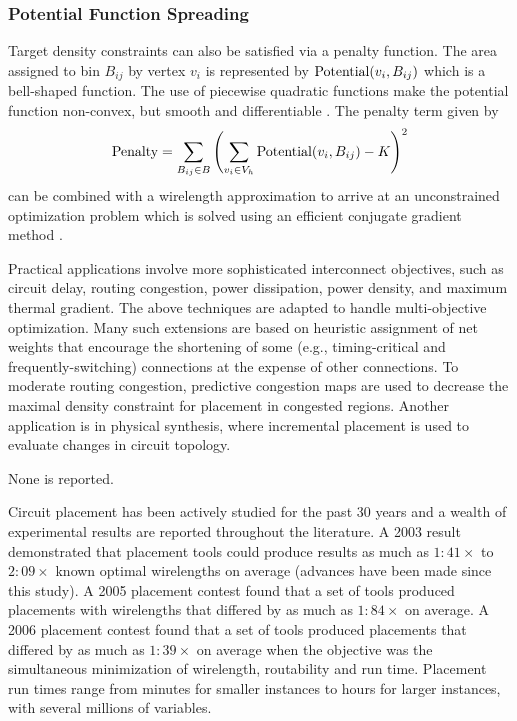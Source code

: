 \documentclass[natbib]{svcyclop}
\begin{document}
\subsubsection{Potential Function Spreading} Target density constraints
can also be satisfied via a penalty function. The
area assigned to bin $B_{ij}$ by vertex $v_i$ is represented by
$\hbox{Potential}(v_i,B_{ij})$ which is a bell-shaped function. The use
of piecewise quadratic functions make the potential function
non-convex, but smooth and differentiable \cite{KhaWan05}. The
penalty term given by
\begin{equation}\label{eq:fifth}
\text{Penalty} = \sum_{B_{ij}\in B}\left(\sum_{v_i\in V_h}\hbox{Potential}(v_i,B_{ij})-K\right)^2
\end{equation}
can be combined with a wirelength approximation to arrive
at an unconstrained optimization problem which is
solved using an efficient conjugate gradient method \cite{KhaWan05}.

\Applic

Practical applications involve more sophisticated interconnect
objectives, such as circuit delay, routing congestion,
power dissipation, power density, and maximum thermal gradient.
The above techniques are adapted to
handle multi-objective optimization. Many such extensions
are based on heuristic assignment of net weights that
encourage the shortening of some (e.g., timing-critical
and frequently-switching) connections at the expense of
other connections. To moderate routing congestion, predictive
congestion maps are used to decrease the maximal
density constraint for placement in congested regions. Another
application is in physical synthesis, where incremental
placement is used to evaluate changes in circuit topology.

\OpenProb

None is reported.

\ExpRes

Circuit placement has been actively studied for the past
30 years and a wealth of experimental results are reported
throughout the literature. A 2003 result demonstrated that
placement tools could produce results as much as $1:41\times$
to $2:09\times$ known optimal wirelengths on average (advances
have been made since this study). A 2005 placement contest
found that a set of tools produced placements with
wirelengths that differed by as much as $1:84\times$ on average.
A 2006 placement contest found that a set of tools produced
placements that differed by as much as $1:39\times$ on average
when the objective was the simultaneous minimization
of wirelength, routability and run time. Placement run
times range from minutes for smaller instances to hours
for larger instances, with several millions of variables.
\end{document}
